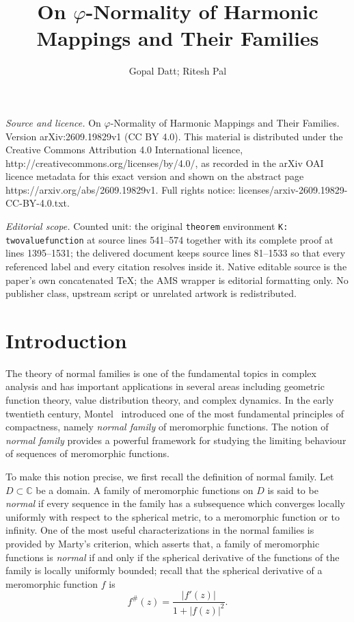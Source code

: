 \documentclass[10pt,a4paper]{amsart}
\numberwithin{equation}{section}
\begin{document}
\title[On varphi-Normality of Harmonic Mappings and Their Families]{On $\varphi$-Normality of Harmonic Mappings and Their Families}
\author{Gopal Datt; Ritesh Pal}
\date{}
\maketitle
\noindent\emph{Source and licence.} On $\varphi$-Normality of Harmonic Mappings and Their Families. Version arXiv:2609.19829v1 (CC BY 4.0). This material is distributed under the Creative Commons Attribution 4.0 International licence, http://creativecommons.org/licenses/by/4.0/, as recorded in the arXiv OAI licence metadata for this exact version and shown on the abstract page https://arxiv.org/abs/2609.19829v1. Full rights notice: licenses/arxiv-2609.19829-CC-BY-4.0.txt.\par\smallskip
\noindent\textit{Editorial scope.} Counted unit: the original \texttt{theorem} environment \texttt{K: twovaluefunction} at source lines 541--574 together with its complete proof at lines 1395--1531; the delivered document keeps source lines 81--1533 so that every referenced label and every citation resolves inside it. Native editable source is the paper's own concatenated TeX; the AMS wrapper is editorial formatting only. No publisher class, upstream script or unrelated artwork is redistributed.
\section{Introduction}

The theory of normal families is one of the fundamental
topics in complex analysis and has  important  applications in several 
areas including geometric function theory,
value distribution theory, and complex dynamics. In the early
twentieth century, Montel~\cite{Montel1912} introduced one of the 
most fundamental principles of compactness, namely {\it normal 
family} of meromorphic functions. The notion
of {\it normal family} provides a powerful framework
for studying the limiting behaviour of sequences of meromorphic
functions.
\smallskip

To make this notion precise, we first recall the definition of 
normal family.
Let $D\subset \mathbb{C}$ be a domain. A family of meromorphic 
functions on $D$  is said to be
\textit{normal} if every sequence in the family has a 
subsequence which converges locally uniformly with 
respect to the spherical metric, to a meromorphic
function or to infinity.
One of the most useful characterizations in the normal
families is provided by Marty's criterion, which asserts that,
a family of meromorphic functions is {\it normal} if and only if the
spherical derivative of the functions of the family is
locally uniformly bounded; recall that the spherical derivative
 of a meromorphic function $f$
is 
\begin{equation}\label{eq:sphder}
f^\#(z)=\frac{|f'(z)|}{1+|f(z)|^2}.
\end{equation}  
\smallskip 
\end{document}
